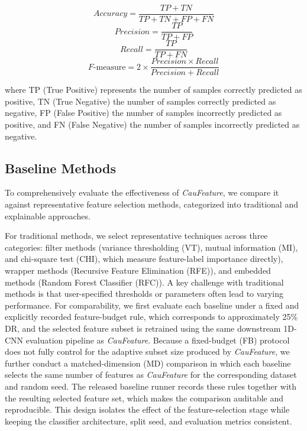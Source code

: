 \documentclass[journal]{IEEEtran}
\begin{document}
\begin{equation}
    Accuracy = \frac{TP + TN}{TP + TN + FP + FN}
\end{equation}
\begin{equation}
    Precision = \frac{TP}{TP + FP}
\end{equation}
\begin{equation}
    Recall = \frac{TP}{TP + FN}
\end{equation}
\begin{equation}
    F\text{-measure} = 2 \times \frac{Precision \times Recall}{Precision + Recall}
\end{equation}

where TP (True Positive) represents the number of samples correctly predicted as positive, TN (True Negative) the number of samples correctly predicted as negative, FP (False Positive) the number of samples incorrectly predicted as positive, and FN (False Negative) the number of samples incorrectly predicted as negative.

\subsection{Baseline Methods}
To comprehensively evaluate the effectiveness of \textit{CauFeature}, we compare it against representative feature selection methods, categorized into traditional and explainable approaches. 

For traditional methods, we select representative techniques across three categories: filter methods (variance thresholding (VT), mutual information (MI), and chi-square test (CHI), which measure feature-label importance directly), wrapper methods (Recursive Feature Elimination (RFE)), and embedded methods (Random Forest Classifier (RFC)). A key challenge with traditional methods is that user-specified thresholds or parameters often lead to varying performance. For comparability, we first evaluate each baseline under a fixed and explicitly recorded feature-budget rule, which corresponds to approximately 25\% DR, and the selected feature subset is retrained using the same downstream 1D-CNN evaluation pipeline as \textit{CauFeature}. Because a fixed-budget (FB) protocol does not fully control for the adaptive subset size produced by \textit{CauFeature}, we further conduct a matched-dimension (MD) comparison in which each baseline selects the same number of features as \textit{CauFeature} for the corresponding dataset and random seed. The released baseline runner records these rules together with the resulting selected feature set, which makes the comparison auditable and reproducible. This design isolates the effect of the feature-selection stage while keeping the classifier architecture, split seed, and evaluation metrics consistent.
\end{document}
